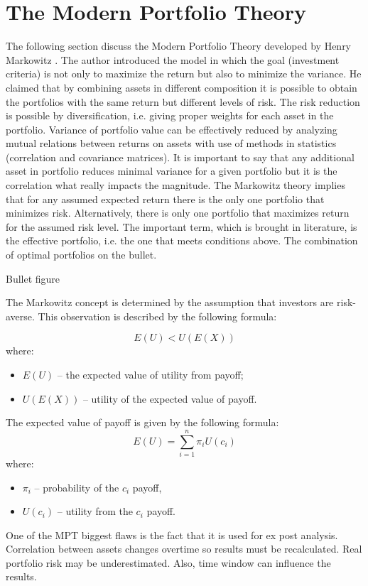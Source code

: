 \documentclass{pracamgr_wne}\usepackage[]{graphicx}\usepackage[]{color}
\begin{document}
\section{The Modern Portfolio Theory}
The following section discuss the Modern Portfolio Theory developed by Henry Markowitz \cite{Markowitz1952}. The author introduced the model in which the goal
(investment criteria) is 
not only to maximize the return but also to minimize the variance. He claimed that by combining assets in different composition it is possible to obtain the 
portfolios with the same return but different levels of risk. The risk reduction is possible by diversification, i.e. giving proper weights for each asset 
in the portfolio. Variance of portfolio value can be effectively reduced by analyzing mutual relations between returns on assets with use of methods in statistics
(correlation and covariance matrices). It is important to say that any additional asset in portfolio reduces minimal variance for a given portfolio 
but it is the correlation what really impacts the magnitude.
The Markowitz theory implies that for any assumed expected return there is the only one portfolio that minimizes risk. Alternatively, there is only one portfolio 
that maximizes return for the assumed risk level. The important term, which is brought in literature, is the effective portfolio, i.e. the one that meets conditions
above.
The combination of optimal portfolios on the bullet.

Bullet figure

The Markowitz concept is determined by the assumption that investors are risk-averse. This observation is described by the following formula:

\begin{equation}
E(U)<U(E(X))
\end{equation}
where:
\begin{itemize}
\item $E(U)$ -- the expected value of utility from payoff;
\item $U(E(X))$ -- utility of the expected value of payoff.
\end{itemize}
The expected value of payoff is given by the following formula:
\begin{equation}
E(U)=\sum_{i=1}^{n}\pi_iU(c_i)
\end{equation}
where:
\begin{itemize}
\item $\pi_i$ -- probability of the $c_i$ payoff,
\item $U(c_i)$ -- utility from the $c_i$ payoff.
\end{itemize}
One of the MPT biggest flaws is the fact that it is used for ex post analysis. Correlation between assets changes overtime so results must be recalculated. Real portfolio risk may be underestimated. Also, time window can influence the results.
\end{document}
